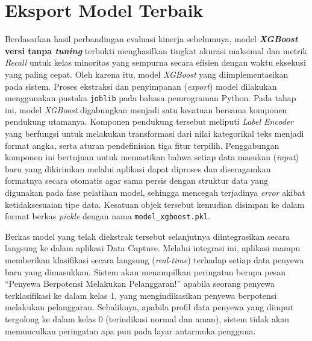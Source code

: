 \section{Eksport Model Terbaik}

Berdasarkan hasil perbandingan evaluasi kinerja sebelumnya, model \textbf{\textit{XGBoost} versi tanpa \textit{tuning}} terbukti menghasilkan tingkat akurasi maksimal dan metrik \textit{Recall} untuk kelas minoritas yang sempurna secara efisien dengan waktu eksekusi yang paling cepat. Oleh karena itu, model \textit{XGBoost} yang diimplementasikan pada sistem. Proses ekstraksi dan penyimpanan (\textit{export}) model dilakukan menggunakan pustaka \texttt{joblib} pada bahasa pemrograman Python. Pada tahap ini, model \textit{XGBoost} digabungkan menjadi satu kesatuan bersama komponen pendukung utamanya. Komponen pendukung tersebut meliputi \textit{Label Encoder} yang berfungsi untuk melakukan transformasi dari nilai kategorikal teks menjadi format angka, serta aturan pendefinisian tiga fitur terpilih. Penggabungan komponen ini bertujuan untuk memastikan bahwa setiap data masukan (\textit{input}) baru yang dikirimkan melalui aplikasi dapat diproses dan diseragamkan formatnya secara otomatis agar sama persis dengan struktur data yang digunakan pada fase pelatihan model, sehingga mencegah terjadinya \textit{error} akibat ketidaksesuaian tipe data. Kesatuan objek tersebut kemudian disimpan ke dalam format berkas \textit{pickle} dengan nama \texttt{model\_xgboost.pkl}.

Berkas model yang telah diekstrak tersebut selanjutnya diintegrasikan secara langsung ke dalam aplikasi Data Capture. Melalui integrasi ini, aplikasi mampu memberikan klasifikasi secara langsung (\textit{real-time}) terhadap setiap data penyewa baru yang dimasukkan. Sistem akan menampilkan peringatan berupa pesan ``Penyewa Berpotensi Melakukan Pelanggaran!'' apabila seorang penyewa terklasifikasi ke dalam kelas 1, yang mengindikasikan penyewa berpotensi melakukan pelanggaran. Sebaliknya, apabila profil data penyewa yang diinput tergolong ke dalam kelas 0 (terindikasi normal dan aman), sistem tidak akan memunculkan peringatan apa pun pada layar antarmuka pengguna.